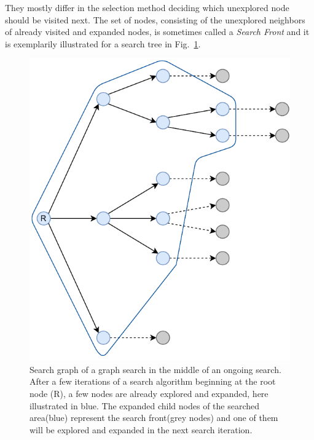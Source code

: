 They mostly differ in the selection method deciding which unexplored node should be visited next.
The set of nodes, consisting of the unexplored neighbors of already visited and expanded nodes, is sometimes called a \textit{Search Front} and it is exemplarily illustrated for a search tree in Fig.~\ref{fig:theory:graph-search-front}.
\begin{figure}[ht!]
    \centering
    \includegraphics[width=\textwidth]{gfx/Figures/Theory/GraphSearchFront.pdf}
    \caption[Search graph of a graph search in the middle of an ongoing search.]{Search graph of a graph search in the middle of an ongoing search. After a few iterations of a search algorithm beginning at the root node (R), a few nodes are already explored and expanded, here illustrated in blue. The expanded child nodes of the searched area(blue) represent the search front(grey nodes) and one of them will be explored and expanded in the next search iteration.}
    \label{fig:theory:graph-search-front}
\end{figure}

